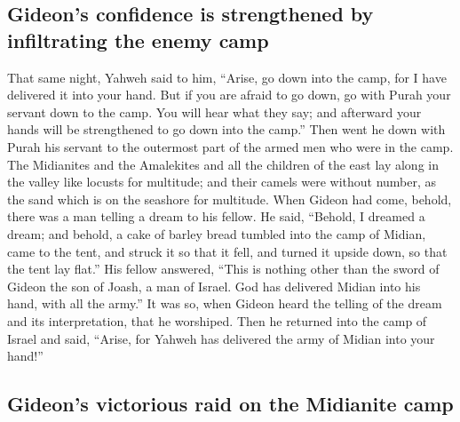 \hypertarget{gideons-confidence-is-strengthened-by-infiltrating-the-enemy-camp}{%
\subsection{Gideon's confidence is strengthened by infiltrating the
enemy
camp}\label{gideons-confidence-is-strengthened-by-infiltrating-the-enemy-camp}}

 That same night, Yahweh said to him, ``Arise, go down
into the camp, for I have delivered it into your hand. 
But if you are afraid to go down, go with Purah your servant down to the
camp.  You will hear what they say; and afterward your
hands will be strengthened to go down into the camp.'' Then went he down
with Purah his servant to the outermost part of the armed men who were
in the camp.  The Midianites and the Amalekites and all
the children of the east lay along in the valley like locusts for
multitude; and their camels were without number, as the sand which is on
the seashore for multitude.  When Gideon had come,
behold, there was a man telling a dream to his fellow. He said,
``Behold, I dreamed a dream; and behold, a cake of barley bread tumbled
into the camp of Midian, came to the tent, and struck it so that it
fell, and turned it upside down, so that the tent lay flat.''
 His fellow answered, ``This is nothing other than the
sword of Gideon the son of Joash, a man of Israel. God has delivered
Midian into his hand, with all the army.''  It was so,
when Gideon heard the telling of the dream and its interpretation, that
he worshiped. Then he returned into the camp of Israel and said,
``Arise, for Yahweh has delivered the army of Midian into your hand!''

\hypertarget{gideons-victorious-raid-on-the-midianite-camp}{%
\subsection{Gideon's victorious raid on the Midianite
camp}\label{gideons-victorious-raid-on-the-midianite-camp}}

